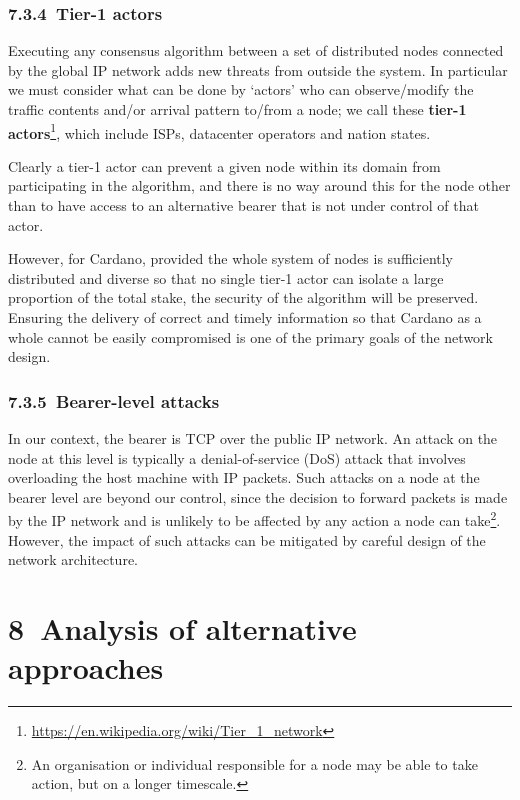 \documentclass[11pt,a4paper]{article}
\begin{document}
\hypertarget{tier-1-actors}{%
\subsubsection{​7.3.4​~Tier-1 actors}\label{tier-1-actors}}

Executing any consensus algorithm between a set of distributed nodes
connected by the global IP network adds new threats from outside the
system. In particular we must consider what can be done by `actors' who
can observe/modify the traffic contents and/or arrival pattern to/from a
node; we call these \textbf{tier-1 actors}\footnote{\href{https://en.wikipedia.org/wiki/Tier_1_network}{{https://en.wikipedia.org/wiki/Tier\_1\_network}}},
which include ISPs, datacenter operators and nation states.

Clearly a tier-1 actor can prevent a given node within its domain from
participating in the algorithm, and there is no way around this for the
node other than to have access to an alternative bearer that is not
under control of that actor.

However, for Cardano, provided the whole system of nodes is sufficiently
distributed and diverse so that no single tier-1 actor can isolate a
large proportion of the total stake, the security of the algorithm will
be preserved. Ensuring the delivery of correct and timely information so
that Cardano as a whole cannot be easily compromised is one of the
primary goals of the network design.

\hypertarget{bearer-level-attacks}{%
\subsubsection{​7.3.5​~Bearer-level
attacks}\label{bearer-level-attacks}}

In our context, the bearer is TCP over the public IP network. An attack
on the node at this level is typically a denial-of-service (DoS) attack
that involves overloading the host machine with IP packets. Such attacks
on a node at the bearer level are beyond our control, since the decision
to forward packets is made by the IP network and is unlikely to be
affected by any action a node can take\footnote{An organisation or
  individual responsible for a node may be able to take action, but on a
  longer timescale.}. However, the impact of such attacks can be
mitigated by careful design of the network architecture.

\hypertarget{analysis-of-alternative-approaches}{%
\section{​8​~Analysis of alternative
approaches}\label{analysis-of-alternative-approaches}}
\end{document}
